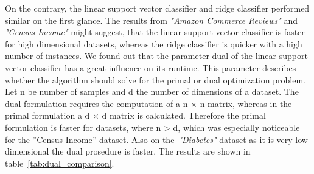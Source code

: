 \documentclass[a4paper,10pt]{article}
\begin{document}
On the contrary, the linear support vector classifier and ridge classifier performed similar
on the first glance. The results from \textit{"Amazon Commerce Reviews"} and \textit{"Census Income"} might suggest,
that the linear support vector classifier is faster for high dimensional datasets, whereas the ridge classifier
is quicker with a high number of instances. We found out that the parameter dual of the linear support
vector classifier has a great influence on its runtime. This parameter describes whether the algorithm
should solve for the primal or dual optimization problem. Let n be number of samples and d the number
of dimensions of a dataset. The dual formulation requires the computation of a n × n matrix, whereas
in the primal formulation a d × d matrix is calculated. Therefore the primal formulation is faster for
datasets, where n > d, which was especially noticeable for the ”Census Income” dataset. Also on the~\textit{"Diabetes"}
dataset as it is very low dimensional the dual prosedure is faster. The results are shown in table~\ref{tab:dual_comparison}.
\end{document}
